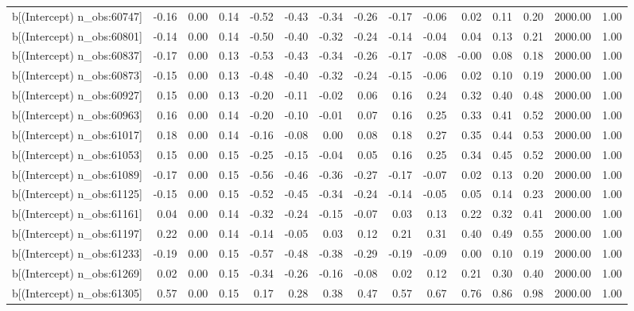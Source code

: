 \begin{table}[ht]
\begin{tabular}{rrrrrrrrrrrrrrr}
  b[(Intercept) n\_obs:60747] & -0.16 & 0.00 & 0.14 & -0.52 & -0.43 & -0.34 & -0.26 & -0.17 & -0.06 & 0.02 & 0.11 & 0.20 & 2000.00 & 1.00 \\ 
  b[(Intercept) n\_obs:60801] & -0.14 & 0.00 & 0.14 & -0.50 & -0.40 & -0.32 & -0.24 & -0.14 & -0.04 & 0.04 & 0.13 & 0.21 & 2000.00 & 1.00 \\ 
  b[(Intercept) n\_obs:60837] & -0.17 & 0.00 & 0.13 & -0.53 & -0.43 & -0.34 & -0.26 & -0.17 & -0.08 & -0.00 & 0.08 & 0.18 & 2000.00 & 1.00 \\ 
  b[(Intercept) n\_obs:60873] & -0.15 & 0.00 & 0.13 & -0.48 & -0.40 & -0.32 & -0.24 & -0.15 & -0.06 & 0.02 & 0.10 & 0.19 & 2000.00 & 1.00 \\ 
  b[(Intercept) n\_obs:60927] & 0.15 & 0.00 & 0.13 & -0.20 & -0.11 & -0.02 & 0.06 & 0.16 & 0.24 & 0.32 & 0.40 & 0.48 & 2000.00 & 1.00 \\ 
  b[(Intercept) n\_obs:60963] & 0.16 & 0.00 & 0.14 & -0.20 & -0.10 & -0.01 & 0.07 & 0.16 & 0.25 & 0.33 & 0.41 & 0.52 & 2000.00 & 1.00 \\ 
  b[(Intercept) n\_obs:61017] & 0.18 & 0.00 & 0.14 & -0.16 & -0.08 & 0.00 & 0.08 & 0.18 & 0.27 & 0.35 & 0.44 & 0.53 & 2000.00 & 1.00 \\ 
  b[(Intercept) n\_obs:61053] & 0.15 & 0.00 & 0.15 & -0.25 & -0.15 & -0.04 & 0.05 & 0.16 & 0.25 & 0.34 & 0.45 & 0.52 & 2000.00 & 1.00 \\ 
  b[(Intercept) n\_obs:61089] & -0.17 & 0.00 & 0.15 & -0.56 & -0.46 & -0.36 & -0.27 & -0.17 & -0.07 & 0.02 & 0.13 & 0.20 & 2000.00 & 1.00 \\ 
  b[(Intercept) n\_obs:61125] & -0.15 & 0.00 & 0.15 & -0.52 & -0.45 & -0.34 & -0.24 & -0.14 & -0.05 & 0.05 & 0.14 & 0.23 & 2000.00 & 1.00 \\ 
  b[(Intercept) n\_obs:61161] & 0.04 & 0.00 & 0.14 & -0.32 & -0.24 & -0.15 & -0.07 & 0.03 & 0.13 & 0.22 & 0.32 & 0.41 & 2000.00 & 1.00 \\ 
  b[(Intercept) n\_obs:61197] & 0.22 & 0.00 & 0.14 & -0.14 & -0.05 & 0.03 & 0.12 & 0.21 & 0.31 & 0.40 & 0.49 & 0.55 & 2000.00 & 1.00 \\ 
  b[(Intercept) n\_obs:61233] & -0.19 & 0.00 & 0.15 & -0.57 & -0.48 & -0.38 & -0.29 & -0.19 & -0.09 & 0.00 & 0.10 & 0.19 & 2000.00 & 1.00 \\ 
  b[(Intercept) n\_obs:61269] & 0.02 & 0.00 & 0.15 & -0.34 & -0.26 & -0.16 & -0.08 & 0.02 & 0.12 & 0.21 & 0.30 & 0.40 & 2000.00 & 1.00 \\ 
  b[(Intercept) n\_obs:61305] & 0.57 & 0.00 & 0.15 & 0.17 & 0.28 & 0.38 & 0.47 & 0.57 & 0.67 & 0.76 & 0.86 & 0.98 & 2000.00 & 1.00 \\ 

\end{tabular}
\end{table}
